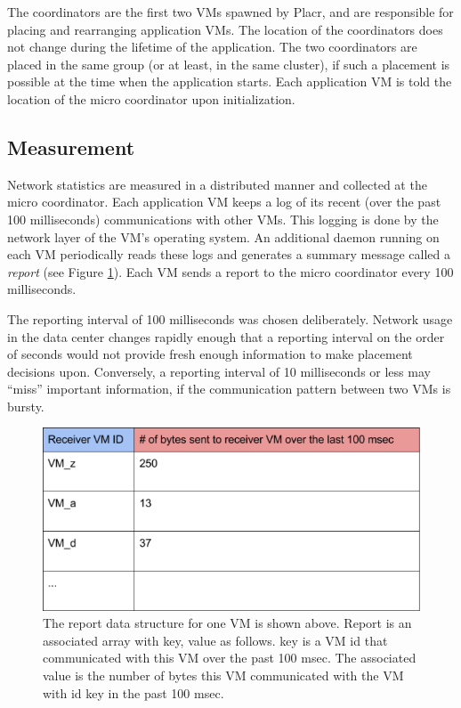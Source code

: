 \documentclass[11pt]{article}
\begin{document}
The coordinators are the first two VMs spawned by Placr, and are responsible for placing and rearranging application VMs.  The location of the coordinators does not change during the lifetime of the application.  The two coordinators are placed in the same group (or at least, in the same cluster), if such a placement is possible at the time when the application starts.  Each application VM is told the location of the micro coordinator upon initialization.

\subsection{Measurement}

Network statistics are measured in a distributed manner and collected at the micro coordinator.  Each application VM keeps a log of its recent (over the past 100 milliseconds) communications with other VMs.  This logging is done by the network layer of the VM's operating system.  An additional daemon running on each VM periodically reads these logs and generates a summary message called a \textit{report} (see Figure \ref{fig:report}).  Each VM sends a report to the micro coordinator every 100 milliseconds.

The reporting interval of 100 milliseconds was chosen deliberately.  Network usage in the data center changes rapidly enough that a reporting interval on the order of seconds would not provide fresh enough information to make placement decisions upon.  Conversely, a reporting interval of 10 milliseconds or less may ``miss'' important information, if the communication pattern between two VMs is bursty.

\begin{figure}
  \centering
\includegraphics[scale=0.65]{measurement.png}

 \caption{The report data structure for one VM is shown above. Report is an associated array with key, value as follows. key is a VM id that communicated with this VM over the past 100 msec. The associated value is the number of bytes this VM communicated with the VM with id key in the past 100 msec.}
 
 \label{fig:report}
\end{figure}
\end{document}
